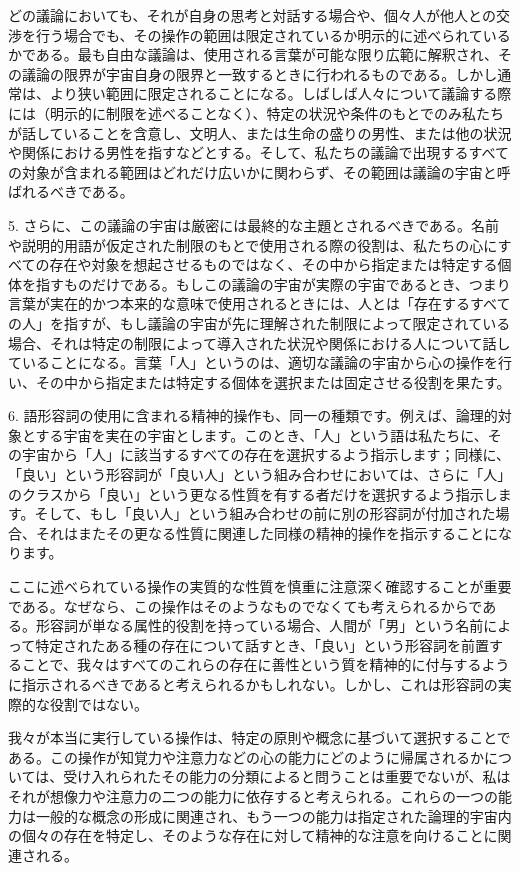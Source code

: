 \documentclass[a4paper,11pt,openany]{ltjsbook}
\begin{document}
どの議論においても、それが自身の思考と対話する場合や、個々人が他人との交渉を行う場合でも、その操作の範囲は限定されているか明示的に述べられているかである。最も自由な議論は、使用される言葉が可能な限り広範に解釈され、その議論の限界が宇宙自身の限界と一致するときに行われるものである。しかし通常は、より狭い範囲に限定されることになる。しばしば人々について議論する際には（明示的に制限を述べることなく）、特定の状況や条件のもとでのみ私たちが話していることを含意し、文明人、または生命の盛りの男性、または他の状況や関係における男性を指すなどとする。そして、私たちの議論で出現するすべての対象が含まれる範囲はどれだけ広いかに関わらず、その範囲は議論の宇宙と呼ばれるべきである。

5. さらに、この議論の宇宙は厳密には最終的な主題とされるべきである。名前や説明的用語が仮定された制限のもとで使用される際の役割は、私たちの心にすべての存在や対象を想起させるものではなく、その中から指定または特定する個体を指すものだけである。もしこの議論の宇宙が実際の宇宙であるとき、つまり言葉が実在的かつ本来的な意味で使用されるときには、人とは「存在するすべての人」を指すが、もし議論の宇宙が先に理解された制限によって限定されている場合、それは特定の制限によって導入された状況や関係における人について話していることになる。言葉「人」というのは、適切な議論の宇宙から心の操作を行い、その中から指定または特定する個体を選択または固定させる役割を果たす。

6. 語形容詞の使用に含まれる精神的操作も、同一の種類です。例えば、論理的対象とする宇宙を実在の宇宙とします。このとき、「人」という語は私たちに、その宇宙から「人」に該当するすべての存在を選択するよう指示します；同様に、「良い」という形容詞が「良い人」という組み合わせにおいては、さらに「人」のクラスから「良い」という更なる性質を有する者だけを選択するよう指示します。そして、もし「良い人」という組み合わせの前に別の形容詞が付加された場合、それはまたその更なる性質に関連した同様の精神的操作を指示することになります。

ここに述べられている操作の実質的な性質を慎重に注意深く確認することが重要である。なぜなら、この操作はそのようなものでなくても考えられるからである。形容詞が単なる属性的役割を持っている場合、人間が「男」という名前によって特定されたある種の存在について話すとき、「良い」という形容詞を前置することで、我々はすべてのこれらの存在に善性という質を精神的に付与するように指示されるべきであると考えられるかもしれない。しかし、これは形容詞の実際的な役割ではない。

我々が本当に実行している操作は、特定の原則や概念に基づいて選択することである。この操作が知覚力や注意力などの心の能力にどのように帰属されるかについては、受け入れられたその能力の分類によると問うことは重要でないが、私はそれが想像力や注意力の二つの能力に依存すると考えられる。これらの一つの能力は一般的な概念の形成に関連され、もう一つの能力は指定された論理的宇宙内の個々の存在を特定し、そのような存在に対して精神的な注意を向けることに関連される。
\end{document}
